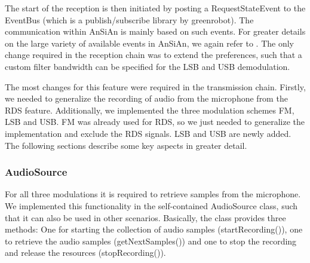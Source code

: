 The start of the reception is then initiated by posting a RequestStateEvent to the EventBus (which is a publish/subscribe library by greenrobot). The communication within AnSiAn is mainly based on such events. For greater details on the large variety of available events in AnSiAn, we again refer to \cite{Kreis2015}. The only change required in the reception chain was to extend the preferences, such that a custom filter bandwidth can be specified for the LSB and USB demodulation. 

The most changes for this feature were required in the transmission chain. Firstly, we needed to generalize the recording of audio from the microphone from the RDS feature. Additionally, we implemented the three modulation schemes FM, LSB and USB. FM was already used for RDS, so we just needed to generalize the implementation and exclude the RDS signals. LSB and USB are newly added. The following sections describe some key aspects in greater detail. 

\subsubsection{AudioSource}

For all three modulations it is required to retrieve samples from the microphone. We implemented this functionality in the self-contained AudioSource class, such that it can also be used in other scenarios. Basically, the class provides three methods: One for starting the collection of audio samples (startRecording()), one to retrieve the audio samples (getNextSamples()) and one to stop the recording and release the resources (stopRecording()). 

